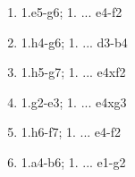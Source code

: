\begin{enumerate}
\setcounter{enumi}{\value{d_counter}}
\item 1.\knight{}e5-g6\mate{}; 1. ... \knight{}e4-f2\mate{}
\item 1.\knight{}h4-g6\mate{}; 1. ... \knight{}d3-b4\mate{}
\item 1.\knight{}h5-g7\mate{}; 1. ... \knight{}e4xf2\mate{}
\item 1.\knight{}g2-e3\mate{}; 1. ... \knight{}e4xg3\mate{}
\item 1.\knight{}h6-f7\mate{}; 1. ... \knight{}e4-f2\mate{}
\item 1.\knight{}a4-b6\mate{}; 1. ... \knight{}e1-g2\mate{}
\setcounter{d_counter}{\value{enumi}}
\end{enumerate}